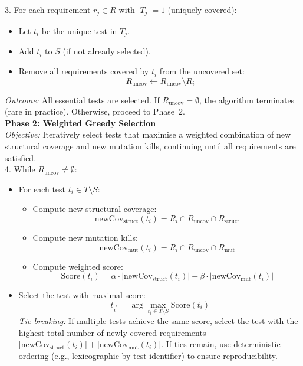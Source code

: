\begin{appendices}
\begin{framed}
3. For each requirement $r_j \in R$ with $|T_j| = 1$ (uniquely covered):
\begin{itemize}
  \item Let $t_i$ be the unique test in $T_j$.
  \item Add $t_i$ to $S$ (if not already selected).
  \item Remove all requirements covered by $t_i$ from the uncovered set:
  \[
    R_{\text{uncov}} \leftarrow R_{\text{uncov}} \setminus R_i
  \]
\end{itemize}

\emph{Outcome:} All essential tests are selected. If $R_{\text{uncov}} = \emptyset$, the algorithm terminates (rare in practice). Otherwise, proceed to Phase~2.\\[8pt]

\noindent\textbf{Phase 2: Weighted Greedy Selection}\\
\emph{Objective:} Iteratively select tests that maximise a weighted combination of new structural coverage and new mutation kills, continuing until all requirements are satisfied.\\[4pt]

4. While $R_{\text{uncov}} \neq \emptyset$:
\begin{itemize}
  \item For each test $t_i \in T \setminus S$:
  \begin{itemize}
    \item Compute new structural coverage:
    \[
      \text{newCov}_{\text{struct}}(t_i) = R_i \cap R_{\text{uncov}} \cap R_{\text{struct}}
    \]
    \item Compute new mutation kills:
    \[
      \text{newCov}_{\text{mut}}(t_i) = R_i \cap R_{\text{uncov}} \cap R_{\text{mut}}
    \]
    \item Compute weighted score:
    \[
      \text{Score}(t_i) = \alpha \cdot |\text{newCov}_{\text{struct}}(t_i)| + \beta \cdot |\text{newCov}_{\text{mut}}(t_i)|
    \]
  \end{itemize}
  
  \item Select the test with maximal score:
  \[
    t_{i^*} = \arg\max_{t_i \in T \setminus S} \text{Score}(t_i)
  \]
  \emph{Tie-breaking:} If multiple tests achieve the same score, select the test with the highest total number of newly covered requirements $|\text{newCov}_{\text{struct}}(t_i)| + |\text{newCov}_{\text{mut}}(t_i)|$. If ties remain, use deterministic ordering (e.g., lexicographic by test identifier) to ensure reproducibility.
  

\end{itemize}
\end{framed}
\end{appendices}
